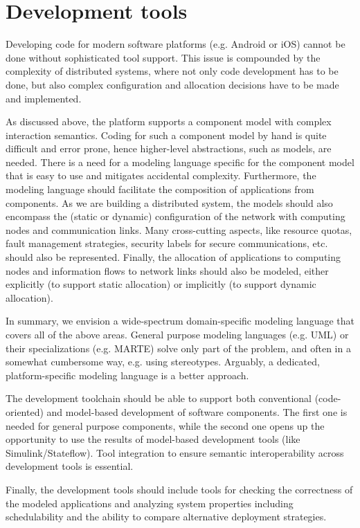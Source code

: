 
\section{Development tools}
\label{sec:development}

Developing code for modern software platforms (e.g. Android or iOS)
cannot be done without sophisticated tool support. This issue is
compounded by the complexity of distributed systems, where not only
code development has to be done, but also complex configuration and
allocation decisions have to be made and implemented.

As discussed above, the platform supports a component model with
complex interaction semantics. Coding for such a component model by
hand is quite difficult and error prone, hence higher-level
abstractions, such as models, are needed. There is a need for a
modeling language specific for the component model that is easy to use
and mitigates accidental complexity. Furthermore, the modeling
language should facilitate the composition of applications from
components. As we are building a distributed system, the models
should also encompass the (static or dynamic) configuration of the
network with computing nodes and communication links. Many
cross-cutting aspects, like resource quotas, fault management
strategies, security labels for secure communications, etc. should
also be represented. Finally, the allocation of applications to computing
nodes and information flows to network links should also be modeled,
either explicitly (to support static allocation) or implicitly (to
support dynamic allocation).

In summary, we envision a wide-spectrum domain-specific modeling
language that covers all of the above areas. General purpose modeling
languages (e.g. UML) or their specializations (e.g. MARTE) solve only
part of the problem, and often in a somewhat cumbersome way,
e.g. using stereotypes. Arguably, a dedicated, platform-specific modeling
language is a better approach.

The development toolchain should be able to support both conventional
(code-oriented) and model-based development of software
components. The first one is needed for general purpose components,
while the second one opens up the opportunity to use the results of
model-based development tools (like Simulink/Stateflow). Tool
integration to ensure semantic interoperability across development
tools is essential.

Finally, the development tools should include tools for checking the
correctness of the modeled applications and analyzing system
properties including schedulability and the ability to compare
alternative deployment strategies.


